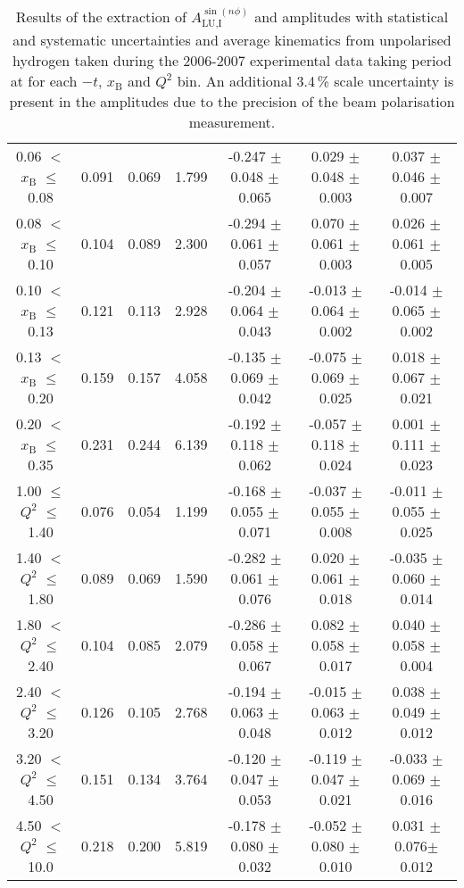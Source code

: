 \begin{table}[width=15cm]
\begin{center}
{\begin{tabular}{|c|c|c|c|c|c|c|}
0.06 $<$ $x_{\textrm{B}}$ $\leqslant$ 0.08 &  0.091 & 0.069 &  1.799 &  -0.247  $\pm$  0.048  $\pm$   0.065 &
0.029 $\pm$  0.048  $\pm$   0.003 & 0.037 $\pm$   0.046  $\pm$   0.007\\
0.08 $<$ $x_{\textrm{B}}$ $\leqslant$ 0.10 &  0.104 & 0.089 &  2.300 &  -0.294 $\pm$  0.061  $\pm$   0.057 &
0.070 $\pm$   0.061  $\pm$   0.003 & 0.026  $\pm$  0.061  $\pm$   0.005\\
0.10 $<$ $x_{\textrm{B}}$ $\leqslant$ 0.13 &  0.121 &  0.113 &  2.928 &  -0.204  $\pm$  0.064   $\pm$  0.043 & 
-0.013  $\pm$  0.064  $\pm$   0.002 & -0.014  $\pm$  0.065  $\pm$   0.002\\
0.13 $<$ $x_{\textrm{B}}$ $\leqslant$ 0.20 &  0.159 & 0.157 &  4.058&  -0.135  $\pm$  0.069  $\pm$   0.042 &
-0.075  $\pm$  0.069  $\pm$   0.025 & 0.018  $\pm$  0.067  $\pm$   0.021 \\
0.20 $<$ $x_{\textrm{B}}$ $\leqslant$ 0.35 &  0.231 & 0.244 &  6.139 &  -0.192 $\pm$ 0.118  $\pm$   0.062 &
-0.057  $\pm$  0.118 $\pm$    0.024 & 0.001  $\pm$  0.111  $\pm$  0.023\\
\hline
1.00 $\leqslant$ $Q^{2}$ $\leqslant$ 1.40 &  0.076 & 0.054  & 1.199 &  -0.168  $\pm$  0.055  $\pm$   0.071 &
-0.037 $\pm$   0.055  $\pm$   0.008 & -0.011  $\pm$  0.055   $\pm$  0.025 \\
1.40 $<$ $Q^{2}$ $\leqslant$ 1.80 &  0.089 & 0.069 &  1.590 &  -0.282 $\pm$  0.061  $\pm$   0.076 &
0.020  $\pm$  0.061  $\pm$   0.018 & -0.035 $\pm$   0.060  $\pm$   0.014\\
1.80 $<$ $Q^{2}$ $\leqslant$ 2.40 &  0.104 & 0.085 &  2.079 &  -0.286 $\pm$   0.058  $\pm$   0.067 &
0.082 $\pm$   0.058  $\pm$   0.017 & 0.040  $\pm$  0.058  $\pm$   0.004\\
2.40 $<$ $Q^{2}$ $\leqslant$ 3.20 &  0.126 & 0.105  & 2.768 &  -0.194 $\pm$   0.063  $\pm$   0.048 &
-0.015  $\pm$  0.063 $\pm$    0.012 & 0.038   $\pm$ 0.049  $\pm$   0.012\\
3.20 $<$ $Q^{2}$ $\leqslant$ 4.50 &  0.151 & 0.134 &  3.764 &  -0.120 $\pm$   0.047  $\pm$   0.053 &
-0.119  $\pm$  0.047 $\pm$    0.021 & -0.033 $\pm$   0.069  $\pm$   0.016\\
4.50 $<$ $Q^{2}$ $\leqslant$ 10.0 &  0.218 & 0.200 &  5.819 &  -0.178  $\pm$  0.080 $\pm$    0.032 &
-0.052  $\pm$  0.080  $\pm$   0.010 & 0.031 $\pm$  0.076$ \pm$  0.012\\
\hline
  \end{tabular}
}
 \end{center}
\caption{Results of the extraction of $A_{\textrm{LU,I}}^{\sin(n\phi)}$ and   amplitudes with statistical and systematic uncertainties and average kinematics from unpolarised hydrogen taken during
the 2006-2007 experimental data taking period at  for each $-t$, $x_{\textrm{B}}$ and $Q^{2}$ bin.
An additional 3.4\,\% scale uncertainty is present in the amplitudes due to the precision of
the beam polarisation measurement.}
\end{table}


